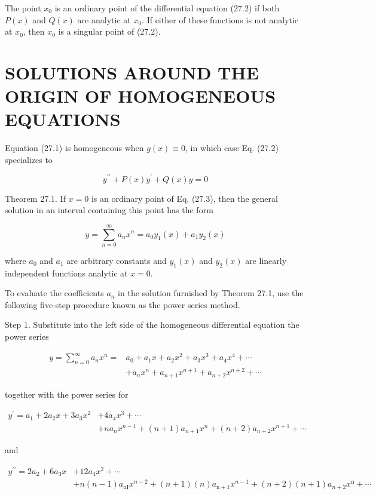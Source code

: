 \documentclass[10pt]{article}
\begin{document}
The point $x_{0}$ is an ordinary point of the differential equation (27.2) if both $P(x)$ and $Q(x)$ are analytic at $x_{0}$. If either of these functions is not analytic at $x_{0}$, then $x_{0}$ is a singular point of (27.2).

\section*{SOLUTIONS AROUND THE ORIGIN OF HOMOGENEOUS EQUATIONS}
Equation (27.1) is homogeneous when $g(x) \equiv 0$, in which case Eq. (27.2) specializes to


\begin{equation*}
y^{\prime \prime}+P(x) y^{\prime}+Q(x) y=0 \tag{27.3}
\end{equation*}


Theorem 27.1. If $x=0$ is an ordinary point of Eq. (27.3), then the general solution in an interval containing this point has the form


\begin{equation*}
y=\sum_{n=0}^{\infty} a_{n} x^{n}=a_{0} y_{1}(x)+a_{1} y_{2}(x) \tag{27.4}
\end{equation*}


where $a_{0}$ and $a_{1}$ are arbitrary constants and $y_{1}(x)$ and $y_{2}(x)$ are linearly independent functions analytic at $x=0$.

To evaluate the coefficients $a_{n}$ in the solution furnished by Theorem 27.1, use the following five-step procedure known as the power series method.

Step 1. Substitute into the left side of the homogeneous differential equation the power series


\begin{align*}
y=\sum_{n=0}^{\infty} a_{n} x^{n}= & a_{0}+a_{1} x+a_{2} x^{2}+a_{3} x^{3}+a_{4} x^{4}+\cdots  \tag{27.5}\\
& +a_{n} x^{n}+a_{n+1} x^{n+1}+a_{n+2} x^{n+2}+\cdots
\end{align*}


together with the power series for


\begin{align*}
y^{\prime}=a_{1}+2 a_{2} x+3 a_{3} x^{2} & +4 a_{4} x^{3}+\cdots \\
& +n a_{n} x^{n-1}+(n+1) a_{n+1} x^{n}+(n+2) a_{n+2} x^{n+1}+\cdots \tag{27.6}
\end{align*}


and


\begin{align*}
y^{\prime \prime}=2 a_{2}+6 a_{3} x & +12 a_{4} x^{2}+\cdots \\
& +n(n-1) a_{\mathrm{nI}} x^{n-2}+(n+1)(n) a_{\mathrm{n}+1} x^{n-1}+(n+2)(n+1) a_{n+2} x^{\mathrm{n}}+\cdots \tag{27.7}
\end{align*}
\end{document}
